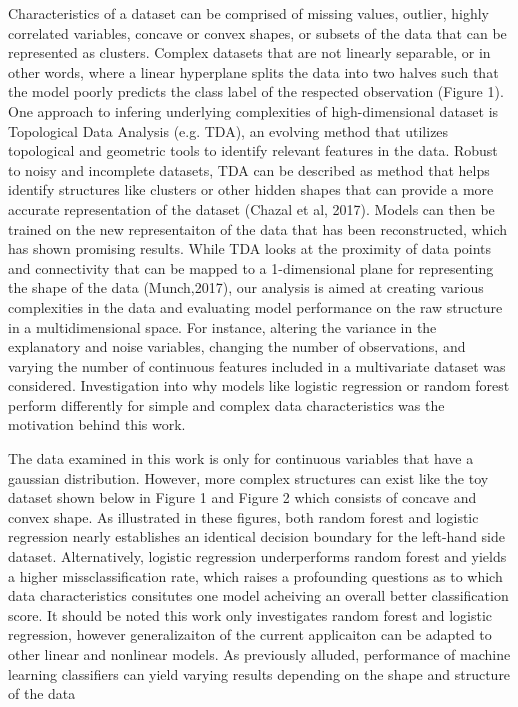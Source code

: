 \documentclass{llncs}
\begin{document}
Characteristics of a dataset can be comprised of missing values, outlier, highly correlated variables, concave or convex shapes, or subsets of the data that can be represented as clusters. Complex datasets that are not linearly separable, or in other words, where a linear hyperplane splits the data into two halves such that the model poorly predicts the class label of the respected observation (Figure 1). One approach to infering underlying complexities of high-dimensional dataset is Topological Data Analysis (e.g. TDA), an evolving method that utilizes topological and geometric tools to identify relevant features in the data. Robust to noisy and incomplete datasets, TDA can be described as method that helps identify structures like clusters or other hidden shapes that can provide a more accurate representation of the dataset (Chazal et al, 2017). Models can then be trained on the new representaiton of the data that has been reconstructed, which has shown promising results. While TDA looks at the proximity of data points and connectivity that can be mapped to a 1-dimensional plane for representing the shape of the data (Munch,2017), our analysis is aimed at creating various complexities in the data and evaluating model performance on the raw structure in a multidimensional space. For instance, altering the variance in the explanatory and noise variables, changing the number of observations, and varying the number of continuous features included in a multivariate dataset was considered. Investigation into why models like logistic regression or random forest perform differently for simple and complex data characteristics was the motivation behind this work.


The data examined in this work is only for continuous variables that have a gaussian distribution. However, more complex structures can exist like the toy dataset shown below in Figure 1 and Figure 2 which consists of concave and convex shape. As illustrated in these figures, both random forest and logistic regression nearly establishes an identical decision boundary for the left-hand side dataset. Alternatively, logistic regression underperforms random forest and yields a higher missclassification rate, which raises a profounding questions as to which data characteristics consitutes one model acheiving an overall better classification score. It should be noted this work only investigates random forest and logistic regression, however generalizaiton of the current applicaiton can be adapted to other linear and nonlinear models. As previously alluded, performance of machine learning classifiers can yield varying results depending on the shape and structure of the data
\end{document}

